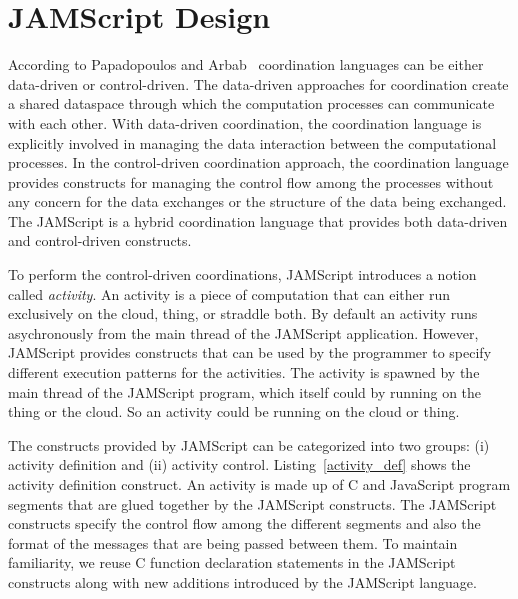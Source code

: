 \documentclass[11pt]{article}
\begin{document}
\section{JAMScript Design}

According to Papadopoulos and Arbab~\cite{Papadopoulos:1998kf} coordination
languages can be either data-driven or control-driven. The data-driven
approaches for coordination create a shared dataspace through which the
computation processes can communicate with each other. With data-driven
coordination, the coordination language is explicitly involved in managing the
data interaction between the computational processes. In the control-driven
coordination approach, the coordination language provides constructs for
managing the control flow among the processes without any concern for the data
exchanges or the structure of the data being exchanged. The JAMScript is a
hybrid coordination language that provides both data-driven and control-driven
constructs.

To perform the control-driven coordinations, JAMScript introduces a notion
called {\em activity}. An activity is a piece of computation that can either run
exclusively on the cloud, thing, or straddle both. By default an activity runs
asychronously from the main thread of the JAMScript application. However,
JAMScript provides constructs that can be used by the programmer to specify
different execution patterns for the activities. The activity is spawned by the
main thread of the JAMScript program, which itself could by running on the thing
or the cloud. So an activity could be running on the cloud or thing.

%

The constructs provided by JAMScript can be categorized into two groups: (i)
activity definition and (ii) activity control. Listing~\ref{activity_def} shows
the activity definition construct. An activity is made up of C and JavaScript
program segments that are glued together by the JAMScript constructs. The
JAMScript constructs specify the control flow among the different segments and
also the format of the messages that are being passed between them. To maintain
familiarity, we reuse C function declaration statements in the JAMScript
constructs along with new additions introduced by the JAMScript language.
\end{document}
